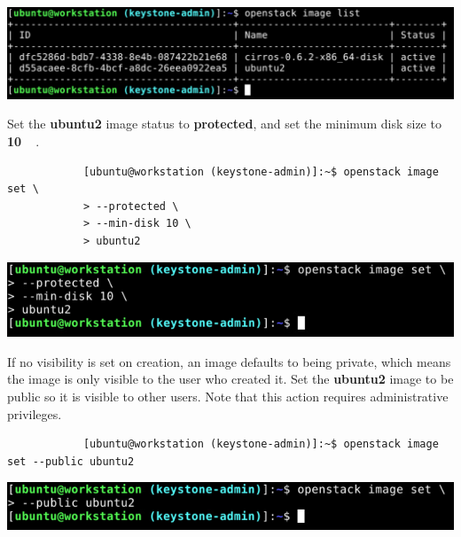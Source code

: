 \documentclass[letterpaper, 12pt]{article}
\begin{document}
\begin{enumerate}
\begin{labstep}
        \begin{center}
            \includegraphics[width=\linewidth]{images/part1/step20.png}
        \end{center}
    \end{labstep}

    \begin{labstep}
        Set the \textbf{ubuntu2} image status to \textbf{protected}, and set the minimum disk size to \textbf{\qty{10}{\giga\byte}}.
        \begin{lstlisting}
            [ubuntu@workstation (keystone-admin)]:~$ openstack image set \
            > --protected \
            > --min-disk 10 \
            > ubuntu2
        \end{lstlisting}

        \begin{center}
            \includegraphics[width=\linewidth]{images/part1/step21.png}
        \end{center}
    \end{labstep}

    \begin{labstep}
        If no visibility is set on creation, an image defaults to being private, which means the image is only visible to the user who created it.
        Set the \textbf{ubuntu2} image to be public so it is visible to other users.
        Note that this action requires administrative privileges.
        \begin{lstlisting}
            [ubuntu@workstation (keystone-admin)]:~$ openstack image set --public ubuntu2
        \end{lstlisting}

        \begin{center}
            \includegraphics[width=\linewidth]{images/part1/step22.png}
        \end{center}
    \end{labstep}


\end{enumerate}
\end{document}
